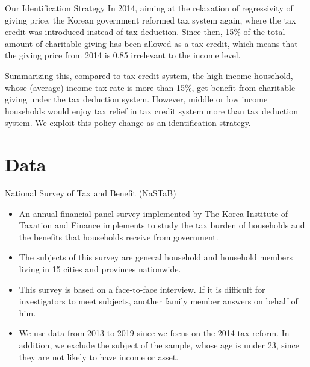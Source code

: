 \documentclass[
  ignorenonframetext,
]{beamer}
\providecommand{\tightlist}{%
  \setlength{\itemsep}{0pt}\setlength{\parskip}{0pt}}
\begin{document}
\begin{frame}{Our Identification Strategy}
\protect\hypertarget{our-identification-strategy}{}
In 2014, aiming at the relaxation of regressivity of giving price, the Korean government reformed tax system again, where the tax credit was introduced instead of tax deduction. Since then, 15\% of the total amount of charitable giving has been allowed as a tax credit, which means that the giving price from 2014 is 0.85 irrelevant to the income level.

Summarizing this, compared to tax credit system, the high income household, whose (average) income tax rate is more than 15\%, get benefit from charitable giving under the tax deduction system. However, middle or low income households would enjoy tax relief in tax credit system more than tax deduction system. We exploit this policy change as an identification strategy.
\end{frame}

\hypertarget{data}{%
\section{Data}\label{data}}

\begin{frame}{National Survey of Tax and Benefit (NaSTaB)}
\protect\hypertarget{national-survey-of-tax-and-benefit-nastab}{}
\begin{itemize}
\tightlist
\item
  An annual financial panel survey implemented by The Korea Institute of Taxation and Finance implements to study the tax burden of households and the benefits that households receive from government.
\item
  The subjects of this survey are general household and household members living in 15 cities and provinces nationwide.
\item
  This survey is based on a face-to-face interview. If it is difficult for investigators to meet subjects, another family member answers on behalf of him.
\item
  We use data from 2013 to 2019 since we focus on the 2014 tax reform. In addition, we exclude the subject of the sample, whose age is under 23, since they are not likely to have income or asset.
\end{itemize}
\end{frame}
\end{document}
